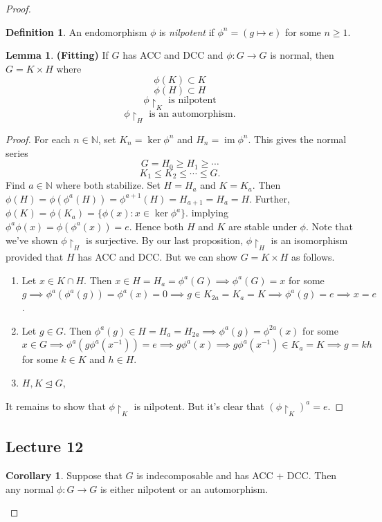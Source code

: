 \documentclass[10pt,letterpaper,cm]{nupset}
\theoremstyle{definition}
\newtheorem*{definition}{Definition}
\newtheorem{corollary}{Corollary}
\newtheorem{lemma}{Lemma}
\newcommand{\N}{\mathbb N}
\newcommand{\1}{\mathbf{1}}
\newcommand{\0}{\vec 0}
\DeclareMathOperator{\im}{im}
\begin{document}
\begin{proof}
\begin{definition}
An endomorphism $\phi$ is \textit{nilpotent} if $\phi^n = (g \mapsto e)$ for some $n\geq 1$.
\end{definition}

\begin{lemma}{\textbf{(Fitting)}}
If $G$ has ACC and DCC and $\phi: G \to G$ is normal, then $G = K \times H$ where $$\phi(K) \subset K$$ $$\phi(H) \subset H$$ $$\phi \restriction_K \text{ is nilpotent}$$ $$\phi \restriction_H \text{ is an automorphism}.$$
\end{lemma}
\begin{proof}
For each $n\in \N$, set $K_n = \ker \phi^n$ and $H_n = \im \phi^n$. This gives the normal series $$G= H_0 \geq H_1 \geq \cdots$$ $$K_1 \leq K_2 \leq \cdots \leq G.$$ Find $a \in \N$ where both stabilize. Set $H = H_a$ and $K = K_a$. Then $\phi(H) = \phi(\phi^a(H)) = \phi^{a+1}(H) = H_{a+1} = H_a = H$. Further, $\phi(K) = \phi(K_a) = \{\phi(x) : x \in \ker \phi^a\}$. implying $\phi^a\phi(x) = \phi(\phi^a(x)) =e$. Hence both $H$ and $K$ are stable under $\phi$. Note that we've shown $\phi \restriction_H$ is surjective. By our last proposition, $\phi \restriction_H$ is an isomorphism provided that $H$ has ACC and DCC. But we can show $G = K \times H$ as follows.
\begin{enumerate}[label=(\alph*)]
\item Let $x \in K \cap H$. Then $x \in H = H_a = \phi^a(G) \implies \phi^a(G) = x$ for some $g \implies \phi^a(\phi^a(g)) = \phi^a(x) =  0 \implies g \in K_{2a} = K_a = K \implies \phi^a(g) = e \implies x =e$. 
\item Let $g \in G$. Then $ \phi^a(g) \in H = H_a = H_{2a} \implies \phi^a(g) = \phi^{2a}(x)$ for some $x\in G \implies \phi^a(g \phi^a(x^{-1})) =e \implies g\phi^a(x) \implies g\phi^a(x^{-1}) \in K_a =K \implies g = kh$ for some $k\in K$ and $h\in H$.
\item $H, K \unlhd G$,
\end{enumerate}
It remains to show that $\phi \restriction_K$ is nilpotent. But it's clear that $(\phi \restriction_K)^a = e$.
\end{proof}

\subsection{Lecture 12}

\begin{corollary} 
Suppose that $G$ is indecomposable and has ACC + DCC. Then any normal $\phi : G \to G$ is either nilpotent or an automorphism.
\end{corollary}


\end{proof}
\end{document}
